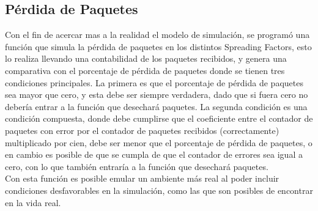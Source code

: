 \begin{justify}
\subsection{Pérdida de Paquetes}
Con el fin de acercar mas a la realidad el modelo de simulación, se programó una función que simula la pérdida de paquetes en los distintos Spreading Factors, esto lo realiza llevando una contabilidad de los paquetes recibidos, y genera una comparativa con el porcentaje de pérdida de paquetes donde se tienen tres condiciones principales. La primera es que el porcentaje de pérdida de paquetes sea mayor que cero, y esta debe ser siempre verdadera, dado que si fuera cero no debería entrar a la función que desechará paquetes. La segunda condición es una condición compuesta, donde debe cumplirse que el coeficiente entre el contador de paquetes con error por el contador de paquetes recibidos (correctamente) multiplicado por cien, debe ser menor que el porcentaje de pérdida de paquetes, o en cambio es posible de que se cumpla de que el contador de errores sea igual a cero, con lo que también entraría a la función que desechará paquetes.\\
Con esta función es posible emular un ambiente más real al poder incluir condiciones desfavorables en la simulación, como las que son posibles de encontrar en la vida real.


\end{justify}
